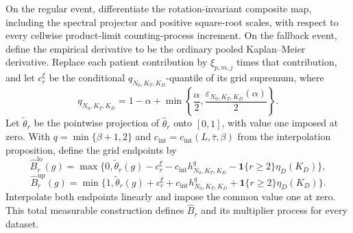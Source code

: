 On the regular event, differentiate the rotation-invariant composite map, including the spectral projector and positive square-root scales, with respect to every cellwise product-limit counting-process increment.  On the fallback event, define the empirical derivative to be the ordinary pooled Kaplan--Meier derivative.  Replace each patient contribution by \(\xi_{p,m,j}\) times that contribution, and let \(c_r^\xi\) be the conditional \(q_{N_0,K_T,K_D}\)-quantile of its grid supremum, where
\[
 q_{N_0,K_T,K_D}=1-\alpha+
 \min\left\{\frac{\alpha}{2},\frac{\varepsilon_{N_0,K_T,K_D}(\alpha)}{2}\right\}.
\]
Let \(\widetilde\theta_r\) be the pointwise projection of \(\widehat\theta_r\) onto \([0,1]\), with value one imposed at zero.  With \(q=\min\{\beta+1,2\}\) and \(c_{\mathrm{int}}=c_{\mathrm{int}}(L,\bar\tau,\beta)\) from the interpolation proposition, define the grid endpoints by
\[
 \widehat B_r^{\mathrm{lo}}(g)=\max\{0,\widetilde\theta_r(g)-c_r^\xi-c_{\mathrm{int}}h_{N_0,K_T,K_D}^{q}-\mathbf 1\{r\ge2\}\eta_D(K_D)\},
\]
\[
 \widehat B_r^{\mathrm{up}}(g)=\min\{1,\widetilde\theta_r(g)+c_r^\xi+c_{\mathrm{int}}h_{N_0,K_T,K_D}^{q}+\mathbf 1\{r\ge2\}\eta_D(K_D)\}.
\]
Interpolate both endpoints linearly and impose the common value one at zero.  This total measurable construction defines \(\widehat B_r\) and its multiplier process for every dataset.